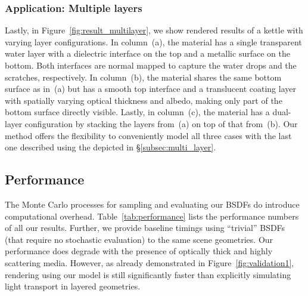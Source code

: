 \subsubsection{Application: Multiple layers}
%
Lastly, in Figure~\ref{fig:result_multilayer}, we show rendered results of a kettle with varying layer configurations.
In column~(a), the material has a single transparent water layer with a dielectric interface on the top and a metallic surface on the bottom.
Both interfaces are normal mapped to capture the water drops and the scratches, respectively.
In column~(b), the material shares the same bottom surface as in~(a) but has a smooth top interface and a translucent coating layer with spatially varying optical thickness and albedo, making only part of the bottom surface directly visible.
Lastly, in column~(c), the material has a dual-layer configuration by stacking the layers from~(a) on top of that from~(b).
Our method offers the flexibility to conveniently model all three cases with the last one described using the  depicted in \S\ref{subsec:multi_layer}.

\subsection{Performance}
%
The Monte Carlo processes for sampling and evaluating our BSDFs do introduce computational overhead.
Table~\ref{tab:performance} lists the performance numbers of all our results.
Further, we provide baseline timings using ``trivial'' BSDFs (that require no stochastic evaluation) to the same scene geometries.
Our performance does degrade with the presence of optically thick and highly scattering media.
However, as already demonstrated in Figure~\ref{fig:validation1}, rendering using our model is still significantly faster than explicitly simulating light transport in layered geometries.







